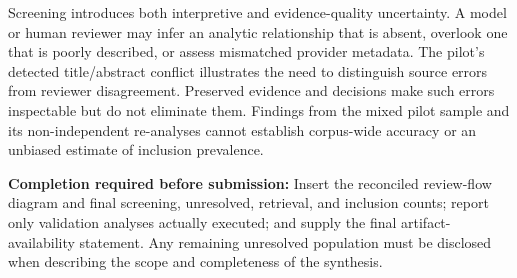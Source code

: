 Screening introduces both interpretive and evidence-quality uncertainty. A model or human reviewer may infer an analytic relationship that is absent, overlook one that is poorly described, or assess mismatched provider metadata. The pilot's detected title/abstract conflict illustrates the need to distinguish source errors from reviewer disagreement. Preserved evidence and decisions make such errors inspectable but do not eliminate them. Findings from the mixed pilot sample and its non-independent re-analyses cannot establish corpus-wide accuracy or an unbiased estimate of inclusion prevalence.

\noindent\textbf{Completion required before submission:} Insert the reconciled review-flow diagram and final screening, unresolved, retrieval, and inclusion counts; report only validation analyses actually executed; and supply the final artifact-availability statement. Any remaining unresolved population must be disclosed when describing the scope and completeness of the synthesis.
